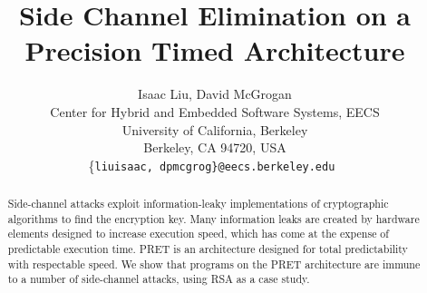 \documentclass[times, 10pt,twocolumn]{article}
\begin{document}
  \title{Side Channel Elimination on a Precision Timed Architecture}

  \author{Isaac Liu, David McGrogan \\
    Center for Hybrid and Embedded Software Systems, EECS \\
    University of California, Berkeley \\
    Berkeley, CA 94720, USA \\
    \{\tt liuisaac, dpmcgrog\}@eecs.berkeley.edu
  }


\maketitle
\thispagestyle{empty}

\begin{abstract}
Side-channel attacks exploit information-leaky implementations of cryptographic algorithms to find the encryption key.  Many information leaks are created by hardware elements designed to increase execution speed, which has come at the expense of predictable execution time.  PRET is an architecture designed for total predictability with respectable speed.  We show that programs on the PRET architecture are immune to a number of side-channel attacks, using RSA as a case study.
\end{abstract}


\end{document}
